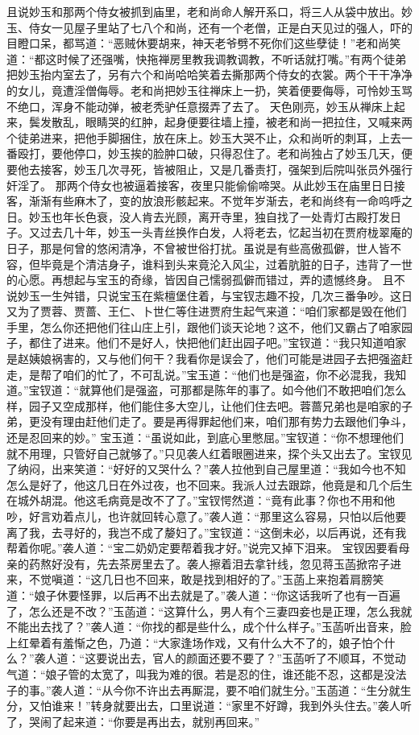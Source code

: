 \documentclass[12pt,oneside]{book}
\begin{document}
且说妙玉和那两个侍女被抓到庙里，老和尚命人解开系口，将三人从袋中放出。妙玉、侍女一见屋子里站了七八个和尚，还有一个老僧，正是白天见过的强人，吓的目瞪口呆，都骂道：“恶贼休要胡来，神天老爷劈不死你们这些孽徒！”老和尚笑道：“都这时候了还强嘴，快拖禅房里教我调教调教，不听话就打嘴。”有两个徒弟把妙玉抬内室去了，另有六个和尚哈哈笑着去撕那两个侍女的衣裳。两个干干净净的女儿，竟遭淫僧侮辱。老和尚把妙玉往禅床上一扔，笑着便要侮辱，可怜妙玉骂不绝口，浑身不能动弹，被老秃驴任意掇弄了去了。
天色刚亮，妙玉从禅床上起来，鬓发散乱，眼睛哭的红肿，起身便要往墙上撞，被老和尚一把拉住，又喊来两个徒弟进来，把他手脚捆住，放在床上。妙玉大哭不止，众和尚听的刺耳，上去一番殴打，要他停口，妙玉挨的脸肿口破，只得忍住了。老和尚独占了妙玉几天，便要他去接客，妙玉几次寻死，皆被阻止，又是几番责打，强架到后院叫张员外强行奸淫了。
那两个侍女也被逼着接客，夜里只能偷偷啼哭。从此妙玉在庙里日日接客，渐渐有些麻木了，变的放浪形骸起来。不觉年岁渐去，老和尚终有一命呜呼之日。妙玉也年长色衰，没人肯去光顾，离开寺里，独自找了一处青灯古殿打发日子。又过去几十年，妙玉一头青丝换作白发，人将老去，忆起当初在贾府栊翠庵的日子，那是何曾的悠闲清净，不曾被世俗打扰。虽说是有些高傲孤僻，世人皆不容，但毕竟是个清洁身子，谁料到头来竟沦入风尘，过着肮脏的日子，违背了一世的心愿。再想起与宝玉的奇缘，皆因自己懦弱孤僻而错过，弄的遗憾终身。
且不说妙玉一生舛错，只说宝玉在紫檀堡住着，与宝钗志趣不投，几次三番争吵。这日又为了贾蓉、贾蔷、王仁、卜世仁等住进贾府生起气来道：“咱们家都是毁在他们手里，怎么你还把他们往山庄上引，跟他们谈天论地？这不，他们又霸占了咱家园子，都住了进来。他们不是好人，快把他们赶出园子吧。”宝钗道：“我只知道咱家是赵姨娘祸害的，又与他们何干？我看你是误会了，他们可能是进园子去把强盗赶走，是帮了咱们的忙了，不可乱说。”宝玉道：“他们也是强盗，你不必混我，我知道。”宝钗道：“就算他们是强盗，可那都是陈年的事了。如今他们不敢把咱们怎么样，园子又空成那样，他们能住多大空儿，让他们住去吧。蓉蔷兄弟也是咱家的子弟，更没有理由赶他们走了。要是再得罪起他们来，咱们那有势力去跟他们争斗，还是忍回来的妙。”
宝玉道：“虽说如此，到底心里憋屈。”宝钗道：“你不想理他们就不用理，只管好自己就够了。”只见袭人红着眼圈进来，探个头又出去了。宝钗见了纳闷，出来笑道：“好好的又哭什么？”袭人拉他到自己屋里道：“我如今也不知怎么是好了，他这几日在外过夜，也不回来。我派人过去跟踪，他竟是和几个后生在城外胡混。他这毛病竟是改不了了。”宝钗愕然道：“竟有此事？你也不用和他吵，好言劝着点儿，也许就回转心意了。”袭人道：“那里这么容易，只怕以后他要离了我，去寻好的，我岂不成了嫠妇了。”宝钗道：“这倒未必，以后再说，还有我帮着你呢。”袭人道：“宝二奶奶定要帮着我才好。”说完又掉下泪来。
宝钗因要看母亲的药熬好没有，先去茶房里去了。袭人擦着泪去拿针线，忽见蒋玉菡掀帘子进来，不觉嗔道：“这几日也不回来，敢是找到相好的了。”玉菡上来抱着肩膀笑道：“娘子休要怪罪，以后再不出去就是了。”袭人道：“你这话我听了也有一百遍了，怎么还是不改？”玉菡道：“这算什么，男人有个三妻四妾也是正理，怎么我就不能出去找了？”袭人道：“你找的都是些什么，成个什么样子。”玉菡听出音来，脸上红晕着有羞惭之色，乃道：“大家逢场作戏，又有什么大不了的，娘子怕个什么？”袭人道：“这要说出去，官人的颜面还要不要了？”玉菡听了不顺耳，不觉动气道：“娘子管的太宽了，叫我为难的很。若是忍的住，谁还能不忍，这都是没法子的事。”袭人道：“从今你不许出去再厮混，要不咱们就生分。”玉菡道：“生分就生分，又怕谁来！”转身就要出去，口里说道：“家里不好蹲，我到外头住去。”袭人听了，哭闹了起来道：“你要是再出去，就别再回来。”
\end{document}
